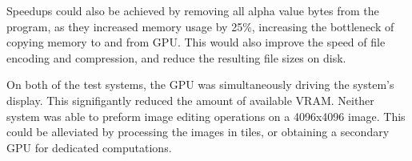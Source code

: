\documentclass[10pt,twocolumn,twoside]{IEEEtran}
\begin{document}
Speedups could also be achieved by removing all alpha value bytes from the program, as they increased memory usage by 25\%, increasing the bottleneck of copying memory to and from GPU. This would also improve the speed of file encoding and compression, and reduce the resulting file sizes on disk.

On both of the test systems, the GPU was simultaneously driving the system's display. This signifigantly reduced the amount of available VRAM. Neither system was able to preform image editing operations on a 4096x4096 image. This could be alleviated by processing the images in tiles, or obtaining a secondary GPU for dedicated computations.




\end{document}
